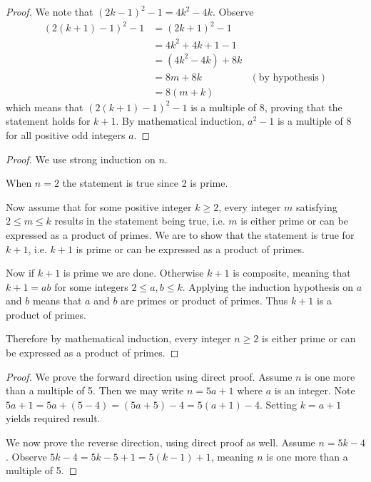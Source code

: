\begin{questions}
\begin{proof}
        We note that $(2k-1)^2 - 1 = 4k^2 - 4k$. Observe
        \begin{align*}
            (2(k+1)-1)^2 - 1 &= (2k+1)^2 - 1\\
            &= 4k^2 + 4k + 1 - 1\\
            &= (4k^2 - 4k) + 8k\\
            &= 8m + 8k & (\text{by hypothesis})\\
            &= 8(m+k)
        \end{align*}
        which means that $(2(k+1)-1)^2 - 1$ is a multiple of 8, proving that the statement holds for $k+1$. By mathematical induction, $a^2 - 1$ is a multiple of 8 for all positive odd integers $a$.
    \end{proof}

    \item \begin{proof}
        We use strong induction on $n$.

        When $n = 2$ the statement is true since 2 is prime.

        Now assume that for some positive integer $k \geq 2$, every integer $m$ satisfying $2 \leq m \leq k$ results in the statement being true, i.e. $m$ is either prime or can be expressed as a product of primes. We are to show that the statement is true for $k + 1$, i.e. $k+1$ is prime or can be expressed as a product of primes.

        Now if $k + 1$ is prime we are done. Otherwise $k + 1$ is composite, meaning that $k + 1 = ab$ for some integers $2 \leq a,b \leq k$. Applying the induction hypothesis on $a$ and $b$ means that $a$ and $b$ are primes or product of primes. Thus $k + 1$ is a product of primes.

        Therefore by mathematical induction, every integer $n \geq 2$ is either prime or can be expressed as a product of primes.
    \end{proof}

    \item \begin{proof}
        We prove the forward direction using direct proof. Assume $n$ is one more than a multiple of 5. Then we may write $n = 5a + 1$ where $a$ is an integer. Note $5a + 1 = 5a + (5 - 4) = (5a + 5) - 4 = 5(a+1) - 4$. Setting $k = a+1$ yields required result.

        We now prove the reverse direction, using direct proof as well. Assume $n = 5k - 4$. Observe $5k - 4 = 5k - 5 + 1 = 5(k-1) + 1$, meaning $n$ is one more than a multiple of 5.
    \end{proof}


\end{questions}
